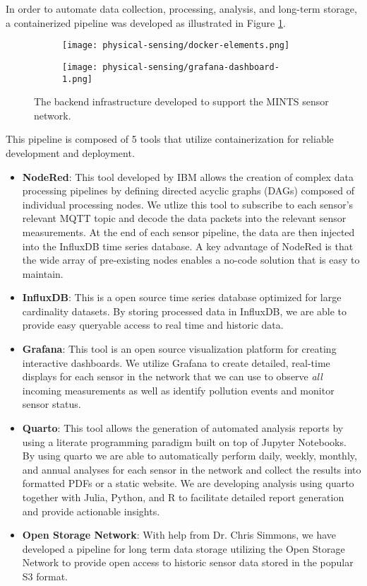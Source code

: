 In order to automate data collection, processing, analysis, and long-term storage, a containerized pipeline was developed as illustrated in Figure \ref{fig:dashboards}.
\begin{figure}[!hbt]
  \begin{subfigure}{.2\textwidth}
    \centering
    \texttt{[image: physical-sensing/docker-elements.png]}
    \caption{}
  \end{subfigure}
  \begin{subfigure}{.8\textwidth}
    \centering
    \texttt{[image: physical-sensing/grafana-dashboard-1.png]}
    \caption{}
  \end{subfigure}
  \caption{The backend infrastructure developed to support the MINTS sensor network.}
  \label{fig:dashboards}
\end{figure}
This pipeline is composed of 5 tools that utilize containerization for reliable development and deployment.
\begin{itemize}
\item \textbf{NodeRed}: This tool developed by IBM allows the creation of complex data processing pipelines by defining directed acyclic graphs (DAGs) composed of individual processing nodes. We utlize this tool to subscribe to each sensor's relevant MQTT topic and decode the data packets into the relevant sensor measurements. At the end of each sensor pipeline, the data are then injected into the InfluxDB time series database. A key advantage of NodeRed is that the wide array of pre-existing nodes enables a no-code solution that is easy to maintain.
\item \textbf{InfluxDB}: This is a open source time series database optimized for large cardinality datasets. By storing processed data in InfluxDB, we are able to provide easy queryable access to real time and historic data.
\item \textbf{Grafana}: This tool is an open source visualization platform for creating interactive dashboards. We utilize Grafana to create detailed, real-time displays for each sensor in the network that we can use to observe \textit{all} incoming measurements as well as identify pollution events and monitor sensor status.
\item \textbf{Quarto}: This tool allows the generation of automated analysis reports by using a literate programming paradigm built on top of Jupyter Notebooks. By using quarto we are able to automatically perform daily, weekly, monthly, and annual analyses for each sensor in the network and collect the results into formatted PDFs or a static website. We are developing analysis using quarto together with Julia, Python, and R to facilitate detailed report generation and provide actionable insights.
\item \textbf{Open Storage Network}: With help from Dr. Chris Simmons, we have developed a pipeline for long term data storage utilizing the Open Storage Network to provide open access to historic sensor data stored in the popular S3 format.
\end{itemize}
